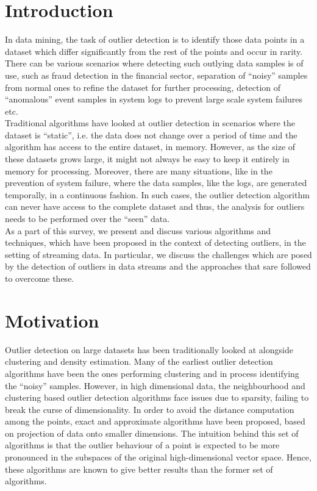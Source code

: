 \section{Introduction}

In data mining, the task of outlier detection is to identify those data points in a dataset which differ significantly from the rest of the points and occur in rarity. There can be various scenarios where detecting such outlying data samples is of use, such as fraud detection in the financial sector, separation of ``noisy'' samples from normal ones to refine the dataset for further processing, detection of ``anomalous'' event samples in system logs to prevent large scale system failures etc. \\

Traditional algorithms have looked at outlier detection in scenarios where the dataset is ``static'', i.e. the data does not change over a period of time and the algorithm has access to the entire dataset, in memory. However, as the size of these datasets grows large, it might not always be easy to keep it entirely in memory for processing. Moreover, there are many situations, like in the prevention of system failure, where the data samples, like the logs, are generated temporally, in a continuous fashion. In such cases, the outlier detection algorithm can never have access to the complete dataset and thus, the analysis for outliers needs to be performed over the ``seen'' data. \\

As a part of this survey, we present and discuss various algorithms and techniques, which have been proposed in the context of detecting outliers, in the setting of streaming data. In particular, we discuss the challenges which are posed by the detection of outliers in data streams and the approaches that sare followed to overcome these.


\section{Motivation}

Outlier detection on large datasets has been traditionally looked at alongside clustering and density estimation. Many of the earliest outlier detection algorithms have been the ones performing clustering and in process identifying the ``noisy'' samples. However, in high dimensional data\cite{aggarwal2001outlier}, the neighbourhood and clustering based outlier detection algorithms face issues due to sparsity, failing to break the curse of dimensionality. In order to avoid the distance computation among the points, exact and approximate algorithms have been proposed, based on projection of data onto smaller dimensions. The intuition behind this set of algorithms is that the outlier behaviour of a point is expected to be more pronounced in the subspaces of the original high-dimensional vector space. Hence, these algorithms are known to give better results than the former set of algorithms. \\

